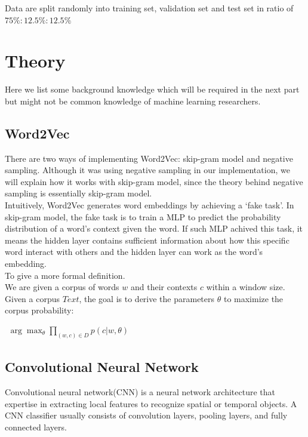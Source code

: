 \documentclass[12pt,openany,a4paper]{book}
\begin{document}
  Data are split randomly into training set, validation set and test set in ratio of $75\%:12.5\%:12.5\%$
  

\chapter{Theory}

Here we list some background knowledge which will be required in the next part but might not be common knowledge of machine learning researchers.
\section{Word2Vec}
There are two ways of implementing Word2Vec\cite{mikolov2013efficient}: skip-gram model and negative sampling. Although it was using negative sampling in our implementation, we will explain how it works with skip-gram model, since the theory behind negative sampling is essentially skip-gram model.\\

Intuitively, Word2Vec generates word embeddings by achieving a `fake task'. In skip-gram model, the fake task is to train a MLP to predict the probability distribution of a word's context given the word. If such MLP achived this task, it means the hidden layer contains sufficient information about how this specific word interact with others and the hidden layer can work as the word's embedding.\\

To give a more formal definition. \\

We are given a corpus of words $w$ and their contexts $c$ within a window size. Given a corpus $Text$, the goal is to derive the parameters $\theta$ to maximize the corpus probability\cite{goldberg2014word2vec}:\\
\begin{center}
$\begin{aligned}
\arg\max_{\theta}\prod_{(w,c)\in D}p(c|w,\theta)
\end{aligned}$
\end{center}


\section{Convolutional Neural Network}

Convolutional neural network(CNN) is a neural network architecture that expertise in extracting local features to recognize spatial or temporal objects\cite{lecun1995convolutional}. A CNN classifier usually consists of convolution layers, pooling layers, and fully connected layers. \\
\end{document}
